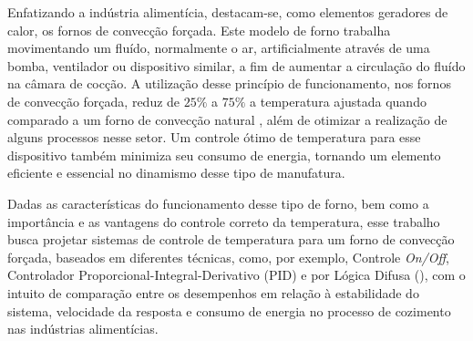     Enfatizando a indústria alimentícia, destacam-se, como elementos geradores de calor, os fornos de convecção forçada. Este modelo de forno trabalha movimentando um fluído, normalmente o ar, artificialmente através de uma bomba, ventilador ou dispositivo similar, a fim de aumentar a circulação do fluído na câmara de cocção. A utilização desse princípio de funcionamento, nos fornos de convecção forçada, reduz de $25\%$ a $75\%$ a temperatura ajustada quando comparado a um forno de convecção natural \cite{ControlesTipicos}, além de otimizar a realização de alguns processos nesse setor. Um controle ótimo de temperatura para esse dispositivo também minimiza seu consumo de energia, tornando um elemento eficiente e essencial no dinamismo desse tipo de manufatura.
    
    Dadas as características do funcionamento desse tipo de forno, bem como a importância e as vantagens do controle correto da temperatura, esse trabalho busca projetar sistemas de controle de temperatura para um forno de convecção forçada, baseados em diferentes técnicas, como, por exemplo, Controle \textit{On/Off}, Controlador Proporcional-Integral-Derivativo (PID) e por Lógica Difusa (\Fuzzy), com o intuito de comparação entre os desempenhos em relação à estabilidade do sistema, velocidade da resposta e consumo de energia no processo de cozimento nas indústrias alimentícias.

